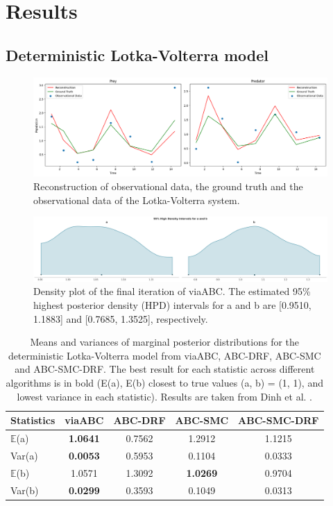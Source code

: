 \documentclass[12pt]{article} %
\begin{document}
\section{Results}


\subsection{Deterministic Lotka-Volterra model}

\begin{figure}
    \centering
    \includegraphics[width=1\linewidth]{figures/LV_system.png}
    \caption{Reconstruction of observational data, the ground truth and the observational data of the Lotka-Volterra system.}
    \label{fig:enter-label}
\end{figure}

\begin{figure}
    \centering
    \includegraphics[width=1\linewidth]{figures/LV_system_density.png}
\caption{Density plot of the final iteration of viaABC. The estimated 95\% highest posterior density (HPD) intervals for a and b are [0.9510, 1.1883] and [0.7685, 1.3525], respectively.}
    \label{fig:enter-label}
\end{figure}

\begin{table}[htbp]
\centering
\begin{tabular}{l cccc}
\toprule
Statistics & viaABC & ABC-DRF & ABC-SMC & ABC-SMC-DRF \\
\midrule
$\mathbb{E}$(a) &\textbf{1.0641} & 0.7562 & 1.2912 & 1.1215 \\
Var(a) & \textbf{0.0053} & 0.5953 & 0.1104 & 0.0333 \\
$\mathbb{E}$(b) & 1.0571 & 1.3092 & \textbf{1.0269} & 0.9704 \\
Var(b) & \textbf{0.0299} & 0.3593 & 0.1049 & 0.0313 \\
\bottomrule
\end{tabular}
\caption{Means and variances of marginal posterior distributions for the deterministic Lotka-Volterra model from viaABC, ABC-DRF, ABC-SMC and ABC-SMC-DRF. The best result for each statistic across different algorithms is in bold (E(a), E(b) closest to true values (a, b) = (1, 1), and lowest variance in each statistic). Results are taken from Dinh et al. \citep{dinh2024approximate}.}
\label{tab:lotka_volterra_results} %
\end{table}
\end{document}
